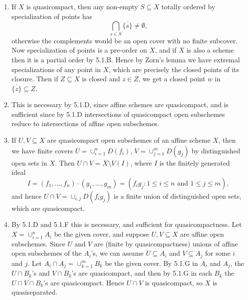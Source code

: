 \documentclass{report}
\newcommand{\closure}[1]{\overline{#1}} %
\begin{document}
\begin{enumerate}[label=\textbf{5.1.\Alph*.}]
	\item If $X$ is quasicompact, then any non-empty $S\subseteq X$ totally
	      ordered by specialization of points has
	      \begin{equation*}
		      \bigcap_{s\in S}\closure{\{s\}} \ne \emptyset,
	      \end{equation*}
	      otherwise the complements would be an open cover with no finite
	      subcover. Now specialization of points is a pre-order on $X$, and if $X$
	      is also a scheme then it is a partial order by 5.1.B. Hence by Zorn's
	      lemma we have extremal specializations of any point in $X$, which are
	      precisely the closed points of its closure. Then if $Z\subseteq X$ is
	      closed and $z\in Z$, we get a closed point $w$ in
	      $\closure{\{z\}}\subseteq Z$.

	\item This is necessary by 5.1.D, since affine schemes are quasicompact, and
	      is sufficient since by 5.1.D intersections of quasicompact open
	      subschemes reduce to intersections of affine open subschemes.

	\item If $U,V\subseteq X$ are quasicompact open subschemes of an affine
	      scheme $X$, then we have finite covers $U=\cup_{i=1}^nD(f_i)$,
	      $V=\cup_{j=1}^mD(g_j)$ by distinguished open sets in $X$. Then
	      $U\cap V=X\setminus V(I)$, where $I$ is the finitely generated ideal
	      \begin{equation*}
		      I
		      = (f_1,\ldots,f_n)\cdot(g_1,\ldots,g_m)
		      = (f_ig_j:\text{$1\le i\le n$ and $1\le j\le m$}),
	      \end{equation*}
	      and hence $U\cap V=\cup_{i,j}D(f_ig_j)$ is a finite union of
	      distinguished open sets, which are quasicompact.

	\item By 5.1.D and 5.1.F this is necessary, and sufficient for
	      quasicompactness. Let $X=\cup_{i=1}^nA_i$ be the given cover, and
	      suppose $U,V\subseteq X$ are affine open subschemes. Since $U$ and $V$
	      are (finite by quasicompactness) unions of affine open subschemes of the
	      $A_i$'s, we can assume $U\subseteq A_i$ and $V\subseteq A_j$ for some
	      $i$ and $j$. Let $A_i\cap A_j=\cup_{k=1}^mB_k$ be the given cover. By
	      5.1.G in $A_i$ and $A_j$, the $U\cap B_k$'s and $V\cap B_k$'s are
	      quasicompact, and then by 5.1.G in each $B_k$ the $U\cap V\cap B_k$'s
	      are quasicompact. Hence $U\cap V$ is quasicompact, so $X$ is
	      quasiseparated.


\end{enumerate}
\end{document}
